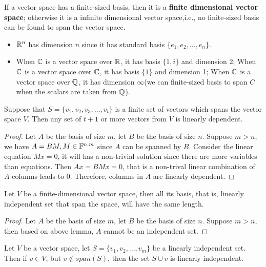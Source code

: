 \begin{refsection}
\begin{definition} If a vector space has a finite-sized basis, then it is a \textbf{finite dimensional vector space}; otherwise it is a infinite dimensional vector space,i.e., no finite-sized basis can be found to span the vector space. 
\end{definition}


\begin{example}\hfill
	\begin{itemize}
		\item $\mathbb{R}^n$ has dimension $n$ since it has standard basis $\{e_1,e_2,...,e_n\}.$
		\item When $\mathbb{C}$ is a vector space over $\mathbb{R}$, it has basis $\{1,i\}$ and dimension 2; When $\mathbb{C}$ is a vector space over $\mathbb{C}$, it has basis $\{1\}$ and dimension 1; When $\mathbb{C}$ is a vector space over $\mathbb{Q}$, it has dimension $\infty$(we can finite-sized basis to span $C$ when the scalars are taken from $\mathbb{Q}$).  
	\end{itemize}	
\end{example}
\begin{lemma}
Suppose that $S=\{v_1,v_2,v_3,…,v_t\}$ is a finite set of vectors which spans the vector space $V$. Then any set of $t+1$ or more vectors from $V$ is linearly dependent.
\end{lemma}
\begin{proof}
Let $A$ be the basis of size $m$, let $B$ be the basis of size $n$. Suppose $m>n$, we have $A = BM, M \in \mathbb{F}^{n,m}$ since $A$ can be spanned by $B$. Consider the linear equation $Mx = 0$, it will has a non-trivial solution since there are more variables than equations. Then $Ax = BMx = 0$, that is a non-trival linear combination of $A$ columns leads to  0. Therefore, columns in $A$ are linearly dependent.	
\end{proof}
 

\begin{theorem}
Let $V$ be a finite-dimensional vector space, then all its basis, that is, linearly independent set that span the space, will have the same length.
\end{theorem}
\begin{proof}
Let $A$ be the basis of size $m$, let $B$ be the basis of size $n$. Suppose $m>n$, then based on above lemma, $A$ cannot be an independent set.
\end{proof}
 

\begin{theorem}
Let $V$ be a vector space, let $S=\{v_1,v_2,...,v_m\}$ be a linearly independent set. Then if $v\in V$, but $v\notin span(S)$, then the set $S\cup v$ is linearly independent. 
\end{theorem}


\end{refsection}
